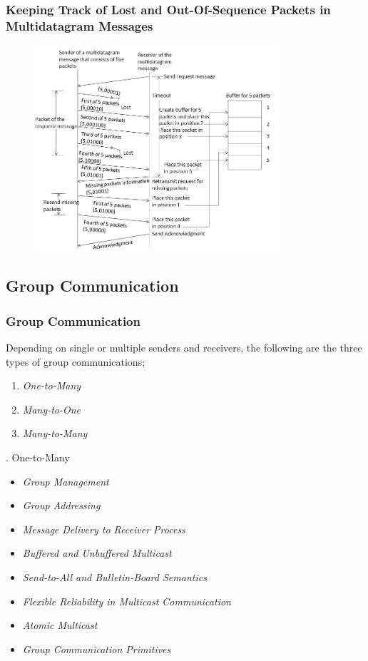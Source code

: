 \documentclass{beamer}
\begin{document}
\begin{frame}
	\frametitle{Keeping Track of Lost and Out-Of-Sequence Packets in 		Multidatagram Messages }
	\begin{figure}
		\centering
		\includegraphics[width=9cm]{fig313.jpg}
	\end{figure}
\end{frame}

\subsection{Group Communication}
\begin{frame}[allowframebreaks]
	\frametitle{Group Communication}
	Depending on single or multiple senders and receivers, the following are the three 
	types of group communications;
	\begin{enumerate}
		\item \textit{One-to-Many}
		\item \textit{Many-to-One}
		\item \textit{Many-to-Many}
	\end{enumerate}	
	\vspace{4cm}
	. One-to-Many
	\begin{itemize}
				\item \textit{Group Management}
				\item \textit{Group Addressing}
				\item \textit{Message Delivery to Receiver Process}
				\item \textit{Buffered and Unbuffered Multicast}
				\item \textit{Send-to-All and Bulletin-Board Semantics}
				\item \textit{Flexible Reliability in Multicast Communication}
				\item \textit{Atomic Multicast}
				\item \textit{Group Communication Primitives}
		\end{itemize}
		\vspace{2cm}
\end{frame}
\end{document}
